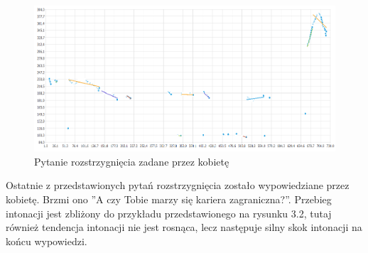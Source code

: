 \documentclass[a4paper,12 pt]{report}
\begin{document}
 \FloatBarrier
\begin{figure}[h]
\centering
\includegraphics[scale=0.85]{pytanie_rozstrzygniecia_3_kobieta.pdf}
\caption{Pytanie rozstrzygnięcia zadane przez kobietę}
\end{figure}
\FloatBarrier
Ostatnie z przedstawionych pytań rozstrzygnięcia zostało wypowiedziane przez kobietę. Brzmi ono ''A czy Tobie marzy się kariera zagraniczna?''.  Przebieg intonacji jest zbliżony do przykładu przedstawionego na rysunku 3.2, tutaj również tendencja intonacji nie jest rosnąca, lecz następuje silny skok intonacji na końcu wypowiedzi.
\end{document}
